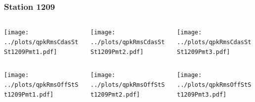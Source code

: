 \documentclass[aspectratio=169]{beamer}
\begin{document}
\begin{frame} 
  \frametitle{Station 1209}
  \begin{center}
    \begin{columns}
      \begin{column}{0.33\textwidth}
        \texttt{[image: ../plots/qpkRmsCdasStSt1209Pmt1.pdf]}
      \end{column}
      \begin{column}{0.33\textwidth}
        \texttt{[image: ../plots/qpkRmsCdasStSt1209Pmt2.pdf]}
      \end{column}
      \begin{column}{0.33\textwidth}
        \texttt{[image: ../plots/qpkRmsCdasStSt1209Pmt3.pdf]}
      \end{column}
    \end{columns}
  \end{center}

  \begin{center}
    \begin{columns}
      \begin{column}{0.33\textwidth}
        \texttt{[image: ../plots/qpkRmsOffStSt1209Pmt1.pdf]}
      \end{column}
      \begin{column}{0.33\textwidth}
        \texttt{[image: ../plots/qpkRmsOffStSt1209Pmt2.pdf]}
      \end{column}
      \begin{column}{0.33\textwidth}
        \texttt{[image: ../plots/qpkRmsOffStSt1209Pmt3.pdf]}
      \end{column}
    \end{columns}
  \end{center}
\end{frame}
\end{document}
